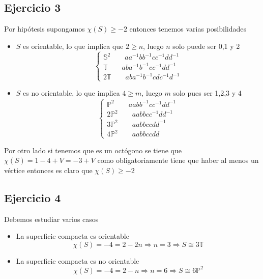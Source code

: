 \documentclass{article}
\begin{document}
\subsection{Ejercicio 3}
Por hipótesis supongamos $\chi(S)\geq -2$ entonces tenemos varias posibilidades
\begin{itemize}
\item $S$ es orientable, lo que implica que $2\geq n$, luego $n$ solo puede ser 0,1 y 2
\begin{equation*}
\left\lbrace \begin{array}{c}
\mathbb{S}^2\qquad aa^{-1}bb^{-1}cc^{-1}dd^{-1}\\
\mathbb{T}\qquad aba^{-1}b^{-1}cc^{-1}dd^{-1}\\
2\mathbb{T}\qquad aba^{-1}b^{-1}cdc^{-1}d^{-1}
\end{array}\right.
\end{equation*}

\item $S$ es no orientable, lo que implica $4\geq m$, luego $m$ solo pues ser 1,2,3 y 4
\begin{equation*}
\left\lbrace\begin{array}{c}
\mathbb{P}^2\qquad aabb^{-1}cc^{-1}dd^{-1}\\
2\mathbb{P}^2\qquad aabbcc^{-1}dd^{-1}\\
3\mathbb{P}^2\qquad aabbccdd^{-1}\\
4\mathbb{P}^2\qquad aabbccdd
\end{array}\right.
\end{equation*}
\end{itemize}

Por otro lado si tenemos que es un octógono se tiene que $\chi(S)=1-4+V=-3+V$ como obligatoriamente tiene que haber al menos un vértice entonces es claro que $\chi(S)\geq -2$

\subsection{Ejercicio 4}
Debemos estudiar varios casos
\begin{itemize}
\item La superficie compacta es orientable
\begin{equation*}
\chi(S)=-4=2-2n\Rightarrow n=3\Rightarrow S\cong 3\mathbb{T}
\end{equation*}

\item La superficie compacta es no orientable
\begin{equation*}
\chi(S)=-4=2-n\Rightarrow n=6\Rightarrow S\cong 6\mathbb{P}^2
\end{equation*}
\end{itemize}
\end{document}
